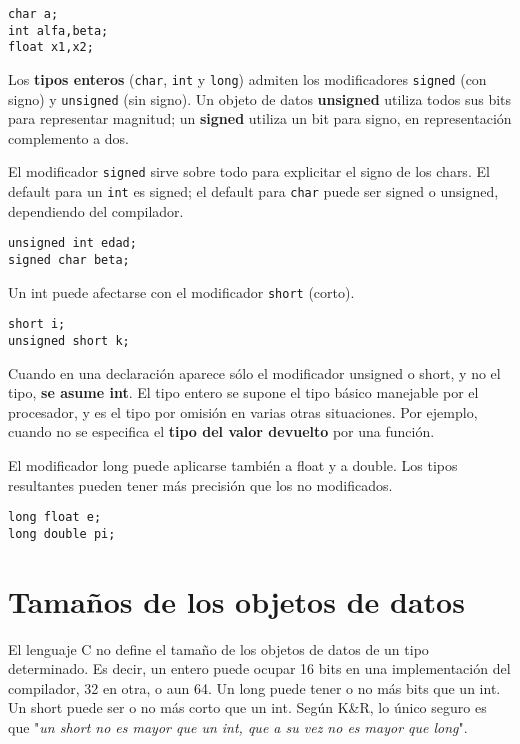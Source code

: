 \begin{lstlisting}
char a;
int alfa,beta;
float x1,x2;
\end{lstlisting}

Los \textbf{tipos enteros} (\texttt{char}, \texttt{int} y \texttt{long}) admiten los modificadores \texttt{signed} (con signo) y \texttt{unsigned} (sin signo). Un objeto de datos \textbf{unsigned} utiliza todos sus bits para representar magnitud; un \textbf{signed} utiliza un bit para signo, en representación complemento a dos.

El modificador \texttt{signed} sirve sobre todo para explicitar el signo de los chars. El default para un \texttt{int} es
signed; el default para \texttt{char} puede ser signed o unsigned, dependiendo del compilador.

\begin{lstlisting}
unsigned int edad;
signed char beta;
\end{lstlisting}


Un int puede afectarse con el modificador \texttt{short} (corto).

\begin{lstlisting}
short i;
unsigned short k;
\end{lstlisting}


Cuando en una declaración aparece sólo el modificador unsigned o short, y no el tipo, \textbf{se asume int}. El
tipo entero se supone el tipo básico manejable por el procesador, y es el tipo por omisión en varias
otras situaciones. Por ejemplo, cuando no se especifica el \textbf{tipo del valor devuelto} por una función.

El modificador long puede aplicarse también a float y a double. Los tipos resultantes pueden tener más
precisión que los no modificados.

\begin{lstlisting}
long float e; 
long double pi;
\end{lstlisting}

\section{Tamaños de los objetos de datos}

El lenguaje C no define el tamaño de los objetos de datos de un tipo determinado. Es decir, un entero
puede ocupar 16 bits en una implementación del compilador, 32 en otra, o aun 64. Un long puede tener o no más bits
que un int. Un short puede ser o no más corto que un int. Según K\&R, lo único seguro es que "\textit{un
short no es mayor que un int, que a su vez no es mayor que long}".

